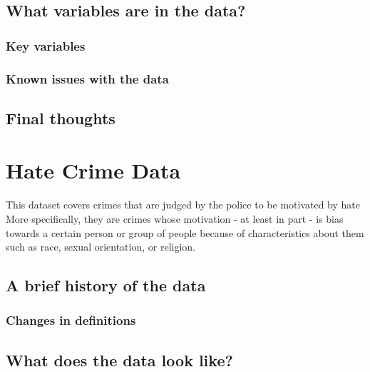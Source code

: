 \documentclass[
  12pt,
  openany]{book}
\begin{document}
\hypertarget{what-variables-are-in-the-data-3}{%
\section{What variables are in the data?}\label{what-variables-are-in-the-data-3}}

\hypertarget{key-variables-3}{%
\subsection{Key variables}\label{key-variables-3}}

\hypertarget{known-issues-with-the-data-3}{%
\subsection{Known issues with the data}\label{known-issues-with-the-data-3}}

\hypertarget{final-thoughts-3}{%
\section{Final thoughts}\label{final-thoughts-3}}

\hypertarget{hate_crimes}{%
\chapter{Hate Crime Data}\label{hate_crimes}}

This dataset covers crimes that are judged by the police to be motivated by hate More specifically, they are crimes whose motivation - at least in part - is bias towards a certain person or group of people because of characteristics about them such as race, sexual orientation, or religion.

\hypertarget{a-brief-history-of-the-data-4}{%
\section{A brief history of the data}\label{a-brief-history-of-the-data-4}}

\hypertarget{changes-in-definitions-4}{%
\subsection{Changes in definitions}\label{changes-in-definitions-4}}

\hypertarget{what-does-the-data-look-like-4}{%
\section{What does the data look like?}\label{what-does-the-data-look-like-4}}
\end{document}
